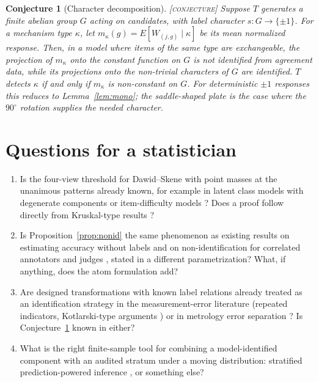 \documentclass[11pt]{article}
\newtheorem{conjecture}{Conjecture}
\theoremstyle{definition}
\theoremstyle{remark}
\newcommand{\status}[1]{\hfill{\normalfont\small\textsc{[#1]}}}
\begin{document}
\begin{conjecture}[Character decomposition]\label{conj:char}\status{conjecture}
Suppose $T$ generates a finite abelian group $G$ acting on candidates, with label character $s:G\to\{\pm1\}$. For a mechanism type $\kappa$, let $m_\kappa(g)=E[W_{(j,g)}\mid\kappa]$ be its mean normalized response. Then, in a model where items of the same type are exchangeable, the projection of $m_\kappa$ onto the constant function on $G$ is not identified from agreement data, while its projections onto the non-trivial characters of $G$ are identified. $T$ detects $\kappa$ if and only if $m_\kappa$ is non-constant on $G$. For deterministic $\pm1$ responses this reduces to Lemma~\ref{lem:mono}; the saddle-shaped plate is the case where the $90^\circ$ rotation supplies the needed character.
\end{conjecture}

\section{Questions for a statistician}

\begin{enumerate}
\item Is the four-view threshold for Dawid--Skene with point masses at the unanimous patterns already known, for example in latent class models with degenerate components or item-difficulty models \cite{whitehill2009,allman2009}? Does a proof follow directly from Kruskal-type results \cite{kruskal1977}?
\item Is Proposition~\ref{prop:nonid} the same phenomenon as existing results on estimating accuracy without labels and on non-identification for correlated annotators and judges \cite{platanios2014,jaffe2016,arxiv260908826}, stated in a different parametrization? What, if anything, does the atom formulation add?
\item Are designed transformations with known label relations already treated as an identification strategy in the measurement-error literature (repeated indicators, Kotlarski-type arguments \cite{livuong1998}) or in metrology error separation \cite{donaldson1972,evans1996}? Is Conjecture~\ref{conj:char} known in either?
\item What is the right finite-sample tool for combining a model-identified component with an audited stratum under a moving distribution: stratified prediction-powered inference \cite{angelopoulos2023}, or something else?
\end{enumerate}
\end{document}
